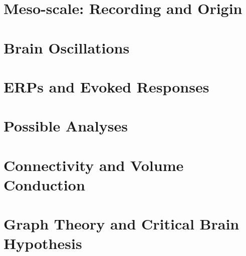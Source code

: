\documentclass[12pt]{article}
\begin{document}
% 

\section{Meso-scale: Recording and Origin}
\graphicspath{ {./images/9/} }

\newpage

\section{Brain Oscillations}
\graphicspath{ {./images/10/} }

\newpage

% 

\section{ERPs and Evoked Responses}
\graphicspath{ {./images/12/} }

\newpage

\section{Possible Analyses}
\graphicspath{ {./images/13/} }

\newpage

\section{Connectivity and Volume Conduction}
\graphicspath{ {./images/14/} }

\newpage

\section{Graph Theory and Critical Brain Hypothesis}
\graphicspath{ {./images/15/} }

\newpage
\end{document}

